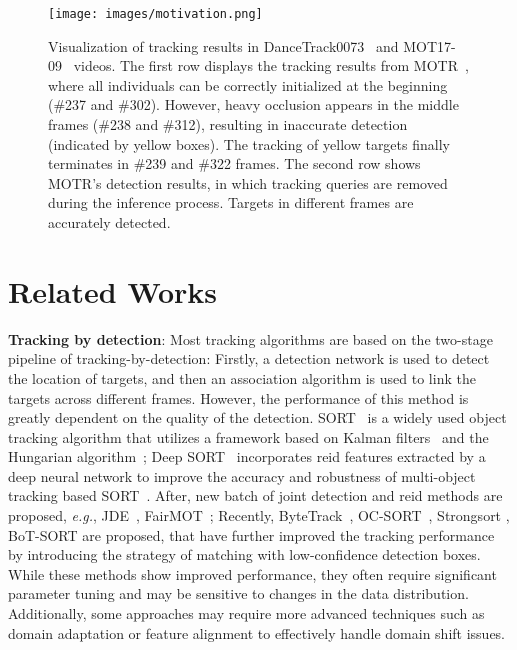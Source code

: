 \documentclass{article}
\begin{document}
\begin{figure*}[t] \centering \texttt{[image: images/motivation.png]} \caption{Visualization of tracking results in DanceTrack0073~\cite{sun2022dancetrack} and MOT17-09~\cite{milan2016mot16} videos. The first row displays the tracking results from MOTR~\cite{zeng2022motr}, where all individuals can be correctly initialized at the beginning (\#237 and \#302). However, heavy occlusion appears in the middle frames (\#238 and \#312), resulting in inaccurate detection (indicated by yellow boxes). The tracking of yellow targets finally terminates in \#239 and \#322 frames. The second row shows MOTR's detection results, in which tracking queries are removed during the inference process. Targets in different frames are accurately detected.} \label{Fig.resultsOfMOTR} \end{figure*}

\section{Related Works}

\textbf{Tracking by detection}: Most tracking algorithms are based on the two-stage pipeline of tracking-by-detection: Firstly, a detection network is used to detect the location of targets, and then an association algorithm is used to link the targets across different frames. However, the performance of this method is greatly dependent on the quality of the detection. SORT~\cite{bewley2016simple} is a widely used object tracking algorithm that utilizes a framework based on Kalman filters~\cite{welch1995introduction} and the Hungarian algorithm~\cite{kuhn1955hungarian}; Deep SORT~\cite{wojke2017simple} incorporates reid features extracted by a deep neural network to improve the accuracy and robustness of multi-object tracking based SORT~\cite{bewley2016simple}. After, new batch of joint detection and reid methods are proposed, \textit{e.g.}, JDE~\cite{wang2020towards}, FairMOT~\cite{zhang2021fairmot}; Recently, ByteTrack~\cite{zhang2022bytetrack}, OC-SORT~\cite{cao2022observation}, Strongsort \cite{du2023strongsort}, BoT-SORT\cite{aharon2022bot} are proposed, that have further improved the tracking performance by introducing the strategy of matching with low-confidence detection boxes. While these methods show improved performance, they often require significant parameter tuning and may be sensitive to changes in the data distribution. Additionally, some approaches may require more advanced techniques such as domain adaptation or feature alignment to effectively handle domain shift issues. 
\end{document}
